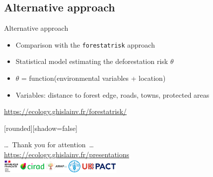 \documentclass[10pt,table,dvipsnames,compress]{beamer}
\begin{document}
\subsection{Alternative approach}
\label{sec:org4464db7}

\begin{frame}[label={sec:org705899c},fragile]{Alternative approach}
 \begin{itemize}
\item Comparison with the \texttt{forestatrisk} approach
\item Statistical model estimating the deforestation risk \(\theta\)
\item \(\theta\) = function(environmental variables + location)
\item Variables: distance to forest edge, roads, towns, protected areas
\end{itemize}

\vspace{0.5cm}
\begin{center}
\url{https://ecology.ghislainv.fr/forestatrisk/}
\end{center}
\end{frame}


{
  [rounded][shadow=false]
  \begin{frame}[plain]
    \begin{block}{}
      \begin{center}
        \ldots~Thank you for attention~\ldots \\
        \url{https://ecology.ghislainv.fr/presentations} \\
        \includegraphics[width=0.45\textwidth]{figs/partners_logos}
      \end{center}
    \end{block}
  \end{frame}
}
\end{document}
